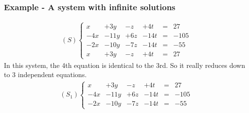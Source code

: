 \documentclass[usenames,dvipsnames,aspectratio=169,10pt]{beamer}
\numberwithin{equation}{section}
\begin{document}
\begin{frame}
\frametitle{Example - A system with infinite solutions}

\begin{align*}
(S)
\left\{
\begin{matrix}
    x &  +3y &   -z &  +4t &=&   27 \\
  -4x & -11y &  +6z & -14t &=& -105 \\
  -2x & -10y &  -7z & -14t &=&  -55 \\
    x &  +3y &   -z &  +4t &=&   27
\end{matrix}
\right.
\end{align*}
In this system, the 4th equation is identical to the 3rd. So it really reduces down
to 3 independent equations.
\begin{align*}
(S_1)
\left\{
\begin{matrix}
    x &  +3y &   -z &  +4t &=&   27 \\
  -4x & -11y &  +6z & -14t &=& -105 \\
  -2x & -10y &  -7z & -14t &=&  -55
\end{matrix}
\right.
\end{align*}

\end{frame}
\end{document}
